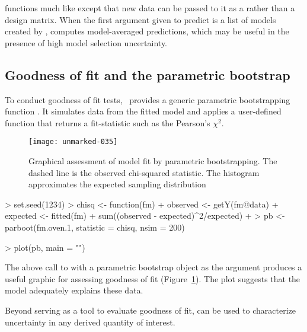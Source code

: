 \documentclass[article,shortnames]{jss}
\newcommand{\um}{\pkg{unmarked}}
\begin{document}
{ functions much like  except that new data can be
passed to it as a  rather than a design matrix. When the first 
argument given to predict is a list of models created by , 
 computes model-averaged predictions, which may be
useful in the presence of high model selection uncertainty.  



\subsection{Goodness of fit and the parametric bootstrap}

To conduct goodness of fit tests, \um\ provides a generic parametric 
bootstrapping function .  It simulates data from the fitted model and 
applies a user-defined function that returns a fit-statistic such as the 
Pearson's $\chi^2$.   



\begin{figure}[th!]
  \centering
\texttt{[image: unmarked-035]}
\caption{Graphical assessment of model fit by parametric bootstrapping.  The dashed 
line is the observed chi-squared statistic. The histogram approximates the 
expected sampling distribution}
\label{fig:pb}
\end{figure}

\begin{Schunk}
\begin{Sinput}
> set.seed(1234)
> chisq <- function(fm) {
+     observed <- getY(fm@data)
+     expected <- fitted(fm)
+     sum((observed - expected)^2/expected)
+ }
> pb <- parboot(fm.oven.1, statistic = chisq, nsim = 200)
\end{Sinput}
\end{Schunk}
\begin{Schunk}
\begin{Sinput}
> plot(pb, main = "")
\end{Sinput}
\end{Schunk}


The above call to  with a parametric bootstrap object as
the argument produces a useful graphic for assessing goodness of fit
(Figure~\ref{fig:pb}).  The plot suggests that the model adequately  
explains these data.

Beyond serving as a tool to evaluate goodness of fit,
 can be used to characterize uncertainty in any derived quantity 
of interest.


}
\end{document}

